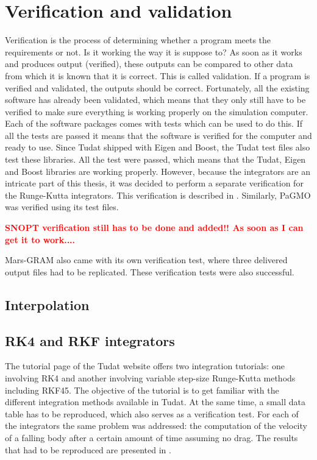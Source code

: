 \chapter{Verification and validation} %
\label{ch:verificationandvalidation}
Verification is the process of determining whether a program meets the requirements or not. Is it working the way it is suppose to? As soon as it works and produces output (verified), these outputs can be compared to other data from which it is known that it is correct. This is called validation. If a program is verified and validated, the outputs should be correct. Fortunately, all the existing software has already been validated, which means that they only still have to be verified to make sure everything is working properly on the simulation computer. Each of the software packages comes with tests which can be used to do this. If all the tests are passed it means that the software is verified for the computer and ready to use. Since \ac{Tudat} shipped with Eigen and Boost, the \ac{Tudat} test files also test these libraries. All the test were passed, which means that the \ac{Tudat}, Eigen and Boost libraries are working properly. However, because the integrators are an intricate part of this thesis, it was decided to perform a separate verification for the Runge-Kutta integrators. This verification is described in . Similarly, \ac{PaGMO} was verified using its test files.

\textbf{\textcolor{red}{SNOPT verification still has to be done and added!! As soon as I can get it to work....}}

 Mars-\ac{GRAM} also came with its own verification test, where three delivered output files had to be replicated. These verification tests were also successful. 


\section{Interpolation}
\label{sec:intver}


\section{\acs{RK4} and \acs{RKF} integrators}
\label{sec:rkandrkfver}
The tutorial page of the \ac{Tudat} website \citep{dirkx2016tudat} offers two integration tutorials: one involving \ac{RK4} and another involving variable step-size Runge-Kutta methods including \ac{RKF45}. The objective of the tutorial is to get familiar with the different integration methods available in \ac{Tudat}. At the same time, a small data table has to be reproduced, which also serves as a verification test. For each of the integrators the same problem was addressed: the computation of the velocity of a falling body after a certain amount of time assuming no drag. The results that had to be reproduced are presented in .


